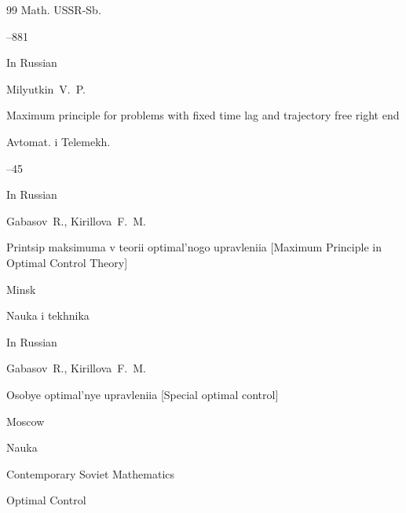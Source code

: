 \begin{thebibliography}{99}
\jour Math. USSR-Sb.




--881








\lang In Russian

\by  Milyutkin~V.~P.

\paper Maximum principle for problems with fixed time lag and trajectory free right end

\jour Avtomat. i Telemekh.



--45




\lang In Russian

\by Gabasov~R., Kirillova~F.~M. 

\book Printsip maksimuma v teorii optimal'nogo upravleniia \rm [Maximum Principle in Optimal Control Theory]

\publaddr Minsk

\publ Nauka i tekhnika






\lang In Russian

\by Gabasov~R., Kirillova~F.~M. 

\book Osobye optimal'nye upravleniia \rm [Special optimal control]

\publaddr Moscow

\publ Nauka








\serial Contemporary Soviet Mathematics

\book Optimal Control


\end{thebibliography}

